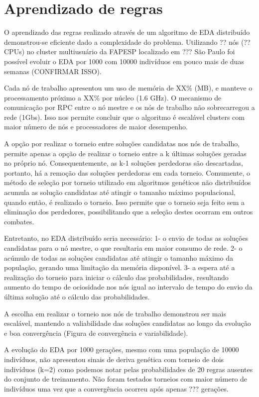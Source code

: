 \chapter{Aprendizado de regras}

O aprendizado das regras realizado através de um algoritmo de EDA distribuído demonstrou-se eficiente dado a complexidade do problema. Utilizando ?? nós (??CPUs) no cluster multiusuário da FAPESP localizado em ??? São Paulo foi possível evoluir o EDA por 1000 com 10000 indivíduos em pouco mais de duas semanas (CONFIRMAR ISSO).

Cada nó de trabalho apresentou um uso de memória de XX\% (MB), e manteve o processamento próximo a XX\% por núcleo (1.6 GHz). O mecanismo de comunicação por RPC entre o nó mestre e os nós de trabalho não sobrecarregou a rede (1Gbs). Isso nos permite concluir que o algoritmo é escalável clusters com maior número de nós e processadores de maior desempenho.

A opção por realizar o torneio entre soluções candidatas nos nós de trabalho, permite apenas a opção de realizar o torneio entre a k últimas soluções geradas no próprio nó. Consequentemente, as k-1 soluções perdedoras são descartadas, portanto, há a remoção das soluções perdedoras em cada torneio. Comumente, o método de seleção por torneio utilizado em algoritmos genéticos não distribuídos acumula as solução candidatas até atingir o tamanho máximo populacional, quando então, é realizado o torneio. Isso permite que o torneio seja feito sem a eliminação dos perdedores, possibilitando que a seleção destes ocorram em outros combates.

Entretanto, no EDA distribuído seria necessário:
1- o envio de todas as soluções candidatas para o nó mestre, o que resultaria em maior consumo de rede.
2- o acúmulo de todas as soluções candidatas até atingir o tamanho máximo da população, gerando uma limitação da memória disponível.
3- a espera até a realização do torneio para iniciar o cálculo das probabilidades, resultando aumento do tempo de ociosidade nos nós igual ao intervalo de tempo do envio da última solução até o cálculo das probabilidades. 

A escolha em realizar o torneio nos nós de trabalho demonstrou ser mais escalável, mantendo a valiabilidade das soluções candidatas ao longo da evolução e boa convergência (Figura de convergência e variabilidade).

A evolução do EDA por 1000 gerações, mesmo com uma população de 10000 indivíduos, não apresentou sinais de deriva genética com torneio de dois indivíduos (k=2) como podemos notar pelas probabilidades de 20 regras ausentes do conjunto de treinamento. Não foram testados torneios com maior número de indivíduos uma vez que a convergência ocorreu após apenas ??? gerações.  

